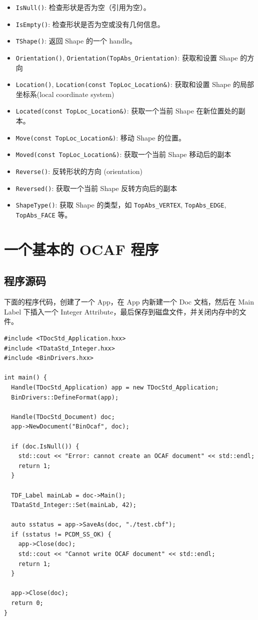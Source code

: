 \documentclass[11pt]{article}
\let\oldsection\section
\renewcommand{\section}{\clearpage\oldsection}
\begin{document}
\begin{itemize}
\item \texttt{IsNull()}: 检查形状是否为空（引用为空）。
\item \texttt{IsEmpty()}: 检查形状是否为空或没有几何信息。
\item \texttt{TShape()}: 返回 Shape 的一个 handle。
\item \texttt{Orientation()}, \texttt{Orientation(TopAbs\_Orientation)}: 获取和设置 Shape 的方向
\item \texttt{Location()}, \texttt{Location(const TopLoc\_Location\&)}: 获取和设置 Shape 的局部坐标系(local coordinate system)
\item \texttt{Located(const TopLoc\_Location\&)}: 获取一个当前 Shape 在新位置处的副本。
\item \texttt{Move(const TopLoc\_Location\&)}: 移动 Shape 的位置。
\item \texttt{Moved(const TopLoc\_Location\&)}: 获取一个当前 Shape 移动后的副本
\item \texttt{Reverse()}: 反转形状的方向 (orientation)
\item \texttt{Reversed()}: 获取一个当前 Shape 反转方向后的副本
\item \texttt{ShapeType()}: 获取 Shape 的类型，如 \texttt{TopAbs\_VERTEX}, \texttt{TopAbs\_EDGE}, \texttt{TopAbs\_FACE} 等。
\end{itemize}
\section{一个基本的 OCAF 程序}
\label{sec:orgae29155}

\subsection{程序源码}
\label{sec:orgbdb9aa8}

下面的程序代码，创建了一个 App，在 App 内新建一个 Doc 文档，然后在 Main Label 下插入一个 Integer Attribute，最后保存到磁盘文件，并关闭内存中的文件。

\begin{verbatim}
#include <TDocStd_Application.hxx>
#include <TDataStd_Integer.hxx>
#include <BinDrivers.hxx>

int main() {
  Handle(TDocStd_Application) app = new TDocStd_Application;
  BinDrivers::DefineFormat(app);

  Handle(TDocStd_Document) doc;
  app->NewDocument("BinOcaf", doc);

  if (doc.IsNull()) {
    std::cout << "Error: cannot create an OCAF document" << std::endl;
    return 1;
  }

  TDF_Label mainLab = doc->Main();
  TDataStd_Integer::Set(mainLab, 42);

  auto sstatus = app->SaveAs(doc, "./test.cbf");
  if (sstatus != PCDM_SS_OK) {
    app->Close(doc);
    std::cout << "Cannot write OCAF document" << std::endl;
    return 1;
  }

  app->Close(doc);
  return 0;
}
\end{verbatim}
\end{document}
